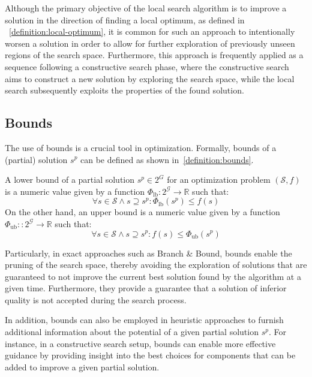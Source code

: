 Although the primary objective of the local search algorithm is to improve a
solution in the direction of finding a local optimum, as defined in
~\ref{definition:local-optimum}, it is common for such an approach to
intentionally worsen a solution in order to allow for further exploration of
previously unseen regions of the search space. Furthermore, this approach is
frequently applied as a sequence following a constructive search phase, where
the constructive search aims to construct a new solution by exploring the search
space, while the local search subsequently exploits the properties of the found
solution.

\subsection{Bounds}
\label{section:bounds}

The use of bounds is a crucial tool in optimization. Formally, bounds of a
(partial) solution $s^{p}$ can be defined as shown in~\ref{definition:bounds}.

\begin{definition}
    \label{definition:bounds}
    A lower bound of a partial solution $s^p \in 2^G$ for an optimization problem
    $(\mathcal{S}, f)$ is a numeric value given by a function $\Phi_\text{lb}
        : 2^{\mathcal{G}} \rightarrow \mathbb{R}$ such that:
    \begin{equation}
        \forall s \in \mathcal{S} \land s \supseteq s^p : \Phi_\text{lb}(s^p) \le f(s)
    \end{equation}
    On the other hand, an upper bound is a numeric value given by a function $\Phi_\text{ub} :
        : 2^{\mathcal{G}} \rightarrow \mathbb{R} $ such that:
    \begin{equation}
        \forall s \in \mathcal{S} \land s \supseteq s^p : f(s) \le \Phi_\text{ub}(s^p)
    \end{equation}
\end{definition}


Particularly, in exact approaches such as Branch \& Bound, bounds
enable the pruning of the search space, thereby avoiding the exploration of
solutions that are guaranteed to not improve the current best solution found by
the algorithm at a given time. Furthermore, they provide a guarantee that a
solution of inferior quality is not accepted during the search process.

In addition, bounds can also be employed in heuristic approaches to furnish
additional information about the potential of a given partial solution $s^{p}$.
For instance, in a constructive search setup, bounds can enable more effective
guidance by providing insight into the best choices for components that can be
added to improve a given partial solution.

